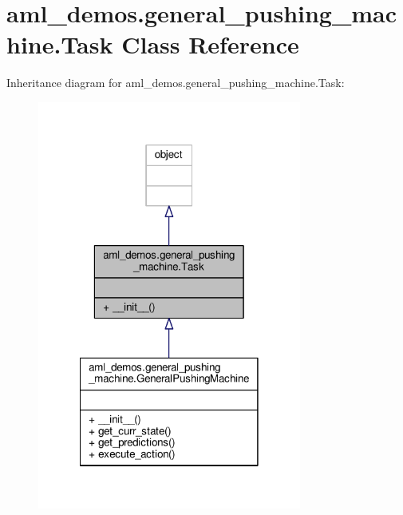 \hypertarget{classaml__demos_1_1general__pushing__machine_1_1_task}{\section{aml\-\_\-demos.\-general\-\_\-pushing\-\_\-machine.\-Task Class Reference}
\label{classaml__demos_1_1general__pushing__machine_1_1_task}
}


Inheritance diagram for aml\-\_\-demos.\-general\-\_\-pushing\-\_\-machine.\-Task\-:
\nopagebreak
\begin{figure}[H]
\begin{center}
\leavevmode
\includegraphics[width=246pt]{classaml__demos_1_1general__pushing__machine_1_1_task__inherit__graph}
\end{center}
\end{figure}


